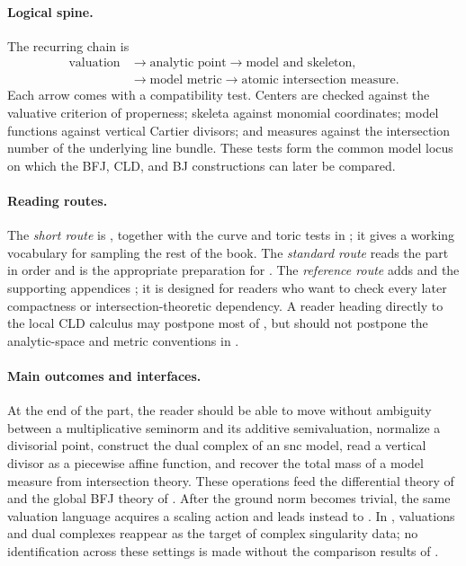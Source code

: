 \paragraph{Logical spine.}
\label{front:part1-logical-spine}
The recurring chain is
\[
\begin{aligned}
 \text{valuation}
 &\longrightarrow \text{analytic point}
 \longrightarrow \text{model and skeleton},\\
 &\longrightarrow \text{model metric}
 \longrightarrow \text{atomic intersection measure}.
\end{aligned}
\]
Each arrow comes with a compatibility test.  Centers are checked against the
valuative criterion of properness; skeleta against monomial coordinates;
model functions against vertical Cartier divisors; and measures against the
intersection number of the underlying line bundle.  These tests form the
common model locus on which the BFJ, CLD, and BJ constructions can later be
compared.

\paragraph{Reading routes.}
\label{front:part1-reading-routes}
The \emph{short route} is
,
together with the curve and toric tests in ; it
gives a working vocabulary for sampling the rest of the book.  The
\emph{standard route} reads the part in order and is the appropriate
preparation for .  The \emph{reference route} adds
 and the supporting appendices
;
it is designed for readers who want to check every later compactness or
intersection-theoretic dependency.  A reader heading directly to the local
CLD calculus may postpone most of , but should
not postpone the analytic-space and metric conventions in
.

\paragraph{Main outcomes and interfaces.}
\label{front:part1-main-outcomes-and-interfaces}
At the end of the part, the reader should be able to move without ambiguity
between a multiplicative seminorm and its additive semivaluation, normalize a
divisorial point, construct the dual complex of an snc model, read a vertical
divisor as a piecewise affine function, and recover the total mass of a model
measure from intersection theory.  These operations feed the differential
theory of  and the global BFJ theory of .
After the ground norm becomes trivial, the same valuation language acquires
a scaling action and leads instead to .  In
, valuations and dual complexes reappear as the target of
complex singularity data; no identification across these settings is made
without the comparison results of .


